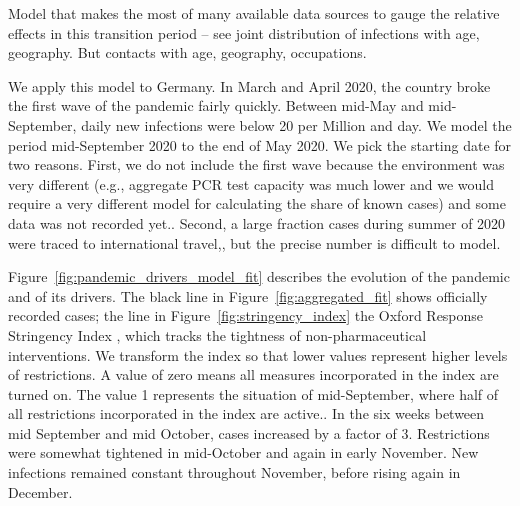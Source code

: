 Model that makes the most of many available data sources to gauge the relative effects in
this transition period -- see joint distribution of infections with age, geography. But
contacts with age, geography, occupations.

We apply this model to Germany. In March and April 2020, the country broke the first wave
of the pandemic fairly quickly. Between mid-May and mid-September, daily new infections
were below 20 per Million and day. We model the
period mid-September 2020 to the end of May 2020. We pick the starting date for two
reasons. First, we do not include the first wave because the environment was very
different (e.g., aggregate PCR test capacity was much lower and we would require a very
different model for calculating the share of known cases) and some data was not recorded
yet.. Second, a
large fraction cases during summer of 2020 were traced to international
travel,, but the precise number is difficult to model.

Figure~\ref{fig:pandemic_drivers_model_fit} describes the evolution of the pandemic and
of its drivers. The black line in Figure~\ref{fig:aggregated_fit} shows officially
recorded cases; the  line in
Figure~\ref{fig:stringency_index} the Oxford Response Stringency Index \citep{Hale2020},
which tracks the tightness of non-pharmaceutical interventions. We transform the index so
that lower values represent higher levels of restrictions. A value of zero means all
measures incorporated in the index are turned on. The value 1 represents the situation of
mid-September, where half of all restrictions incorporated in the index are
active.. In the six weeks between mid September and mid October, cases
increased by a factor of 3.
Restrictions were somewhat tightened in mid-October and again in early November. New
infections remained constant throughout November, before rising again in December.

